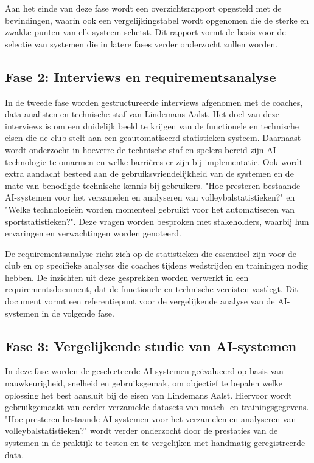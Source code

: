 Aan het einde van deze fase wordt een overzichtsrapport opgesteld met de bevindingen, waarin ook een vergelijkingstabel wordt opgenomen die de sterke en zwakke punten van elk systeem schetst. Dit rapport vormt de basis voor de selectie van systemen die in latere fases verder onderzocht zullen worden.
\subsection{Fase 2: Interviews en requirementsanalyse}
In de tweede fase worden gestructureerde interviews afgenomen met de coaches, data-analisten en technische staf van Lindemans Aalst. Het doel van deze interviews is om een duidelijk beeld te krijgen van de functionele en technische eisen die de club stelt aan een geautomatiseerd statistieken systeem. Daarnaast wordt onderzocht in hoeverre de technische staf en spelers bereid zijn AI-technologie te omarmen en welke barrières er zijn bij implementatie. Ook wordt extra aandacht besteed aan de gebruiksvriendelijkheid van de systemen en de mate van benodigde technische kennis bij gebruikers. "Hoe presteren bestaande AI-systemen voor het verzamelen en analyseren van volleybalstatistieken?" en "Welke technologieën worden momenteel gebruikt voor het automatiseren van sportstatistieken?". Deze vragen worden besproken met stakeholders, waarbij hun ervaringen en verwachtingen worden genoteerd.

De requirementsanalyse richt zich op de statistieken die essentieel zijn voor de club en op specifieke analyses die coaches tijdens wedstrijden en trainingen nodig hebben. De inzichten uit deze gesprekken worden verwerkt in een requirementsdocument, dat de functionele en technische vereisten vastlegt. Dit document vormt een referentiepunt voor de vergelijkende analyse van de AI-systemen in de volgende fase.
\subsection{Fase 3: Vergelijkende studie van AI-systemen}
In deze fase worden de geselecteerde AI-systemen geëvalueerd op basis van nauwkeurigheid, snelheid en gebruiksgemak, om objectief te bepalen welke oplossing het best aansluit bij de eisen van Lindemans Aalst. Hiervoor wordt gebruikgemaakt van eerder verzamelde datasets van match- en trainingsgegevens. "Hoe presteren bestaande AI-systemen voor het verzamelen en analyseren van volleybalstatistieken?" wordt verder onderzocht door de prestaties van de systemen in de praktijk te testen en te vergelijken met handmatig geregistreerde data.

